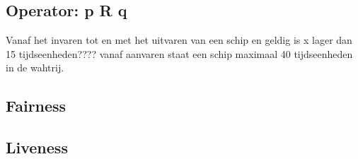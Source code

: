 \documentclass{article}
\begin{document}
	\subsection{Operator: p R q}
	Vanaf het invaren tot en met het uitvaren van een schip en geldig is x lager dan 15 tijdseenheden????
	vanaf aanvaren staat een schip maximaal 40 tijdseenheden in de wahtrij.
	\subsection{Fairness}
	
	\subsection{Liveness}
	
	\newpage
	
	\newpage
	
	
\end{document}
